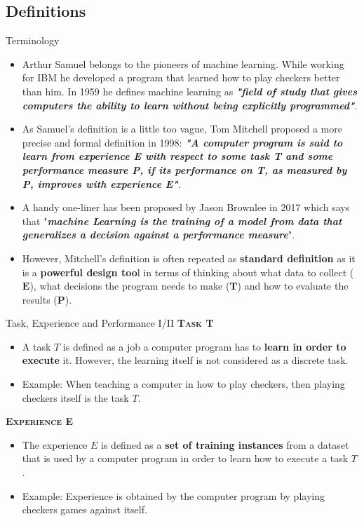 \documentclass[main.tex]{subfiles}
\begin{document}
    \subsection{Definitions}
    
    \begin{frame}{Terminology}
        \begin{itemize}
            \item Arthur Samuel belongs to the pioneers of machine learning. While working for IBM he developed a program that learned how to play checkers better than him. In 1959 he defines machine learning as \textbf{\textit{"field of study that gives computers the ability to learn without being explicitly programmed"}}.
            \item As Samuel's definition is a little too vague, Tom Mitchell proposed a more precise and formal definition in 1998: \textbf{\textit{"A computer program is said to learn from experience E with respect to some task T and some performance measure P, if its performance on T, as measured by P, improves with experience E"}}.
            \item A handy one-liner has been proposed by Jason Brownlee in 2017 which says that "\textbf{\textit{machine Learning is the training of a model from data that generalizes a decision against a performance measure}}".
            \item However, Mitchell's definition is often repeated as \textbf{standard definition} as it is a \textbf{powerful design too}l in terms of thinking about what data to collect ($\pmb{E}$), what decisions the program needs to make ($\pmb{T}$) and how to evaluate the results ($\pmb{P}$).
        \end{itemize}
    \end{frame}

    \begin{frame}{Task, Experience and Performance I/II}
        \alert{\textsc{\textbf{Task T}}}
        \vspace{-1mm}
        \begin{itemize}
            \item A task $T$ is defined as a job a computer program has to \textbf{learn in order to execute} it. However, the learning itself is not considered as a discrete task.
            \item Example: When teaching a computer in how to play checkers, then playing checkers itself is the task $T$.
        \end{itemize}
        
        \alert{\textsc{\textbf{Experience E}}}
        \vspace{-1mm}
        \begin{itemize}
            \item The experience $E$ is defined as a \textbf{set of training instances} from a dataset that is used by a computer program in order to learn how to execute a task $T$.
            \item Example: Experience is obtained by the computer program by playing checkers games against itself. 
        \end{itemize}
    \end{frame}
    
\end{document}
